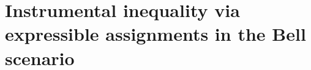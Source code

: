 \documentclass[aps,english,superscriptaddress,onecolumn,twoside,longbibliography,pra,floatfix,fleqn,notitlepage,nofootinbib]{revtex4-1}
\theoremstyle{definition}
\begin{document}

\section{Instrumental inequality via expressible assignments in the Bell scenario}
\end{document}
